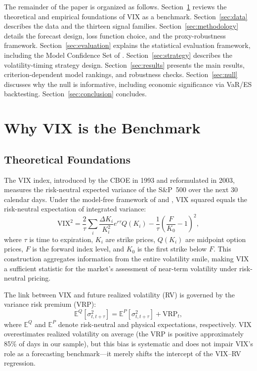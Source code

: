 \documentclass[12pt,a4paper]{article}
\begin{document}
The remainder of the paper is organized as follows. Section~\ref{sec:whyvix} reviews the theoretical and empirical foundations of VIX as a benchmark. Section~\ref{sec:data} describes the data and the thirteen signal families. Section~\ref{sec:methodology} details the forecast design, loss function choice, and the \citet{patton2011} proxy-robustness framework. Section~\ref{sec:evaluation} explains the statistical evaluation framework, including the Model Confidence Set of \citet{hansen2011mcs}. Section~\ref{sec:strategy} describes the volatility-timing strategy design. Section~\ref{sec:results} presents the main results, criterion-dependent model rankings, and robustness checks. Section~\ref{sec:null} discusses why the null is informative, including economic significance via VaR/ES backtesting. Section~\ref{sec:conclusion} concludes.


\section{Why VIX is the Benchmark}
\label{sec:whyvix}

\subsection{Theoretical Foundations}

The VIX index, introduced by the CBOE in 1993 and reformulated in 2003, measures the risk-neutral expected variance of the S\&P~500 over the next 30 calendar days. Under the model-free framework of \citet{britten2000} and \citet{jiang2005}, VIX squared equals the risk-neutral expectation of integrated variance:
\begin{equation}
\text{VIX}^2 = \frac{2}{\tau} \sum_i \frac{\Delta K_i}{K_i^2} e^{r\tau} Q(K_i) - \frac{1}{\tau}\left(\frac{F}{K_0}-1\right)^2,
\label{eq:vix}
\end{equation}
where $\tau$ is time to expiration, $K_i$ are strike prices, $Q(K_i)$ are midpoint option prices, $F$ is the forward index level, and $K_0$ is the first strike below $F$. This construction aggregates information from the entire volatility smile, making VIX a sufficient statistic for the market's assessment of near-term volatility under risk-neutral pricing.

The link between VIX and future realized volatility (RV) is governed by the variance risk premium (VRP):
\begin{equation}
\mathbb{E}^Q[\sigma^2_{t,t+\tau}] = \mathbb{E}^P[\sigma^2_{t,t+\tau}] + \text{VRP}_t,
\label{eq:vrp}
\end{equation}
where $\mathbb{E}^Q$ and $\mathbb{E}^P$ denote risk-neutral and physical expectations, respectively. VIX overestimates realized volatility on average (the VRP is positive approximately 85\% of days in our sample), but this bias is systematic and does not impair VIX's role as a forecasting benchmark---it merely shifts the intercept of the VIX--RV regression.
\end{document}

